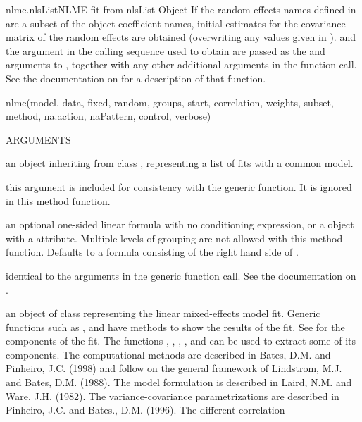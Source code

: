 \documentclass[pdftex]{article} \usepackage{url,graphicx}
\begin{document}
\begin{Helpfile}{nlme.nlsList}{NLME fit from nlsList Object}
If the random effects names defined in  are a subset of
the  object coefficient names, initial estimates for the
covariance matrix of the random effects are obtained (overwriting any
values given in ).  and the
 argument in the calling sequence used to obtain
 are passed as the  and  arguments
to , together with any other additional arguments in
the function call. See the documentation on  for a
description of that function.
\begin{Example}
nlme(model, data, fixed, random, groups, start, correlation, weights,
     subset, method, na.action, naPattern, control, verbose)
\end{Example}
\begin{Argument}{ARGUMENTS}
\item[\Co{model:}]
an object inheriting from class ,
representing a list of  fits with a common model.
\item[\Co{data:}]
this argument is included for consistency with the generic
function. It is ignored in this method function.
\item[\Co{random:}]
an optional one-sided linear formula with no conditioning
expression, or a  object with a 
attribute. Multiple levels of grouping are not allowed with this
method function.  Defaults to a formula consisting of the right hand
side of .
\item[\Co{other arguments:}]
identical to the arguments in the generic
function call. See the documentation on .
\end{Argument}
an object of class  representing the linear mixed-effects
model fit. Generic functions such as ,  and
 have methods to show the results of the fit. See
 for the components of the fit. The functions
, , , , and
  can be used to extract some of its components.
The computational methods are described in Bates, D.M. and Pinheiro, J.C.
(1998) and follow on the general framework of Lindstrom, M.J. and Bates,
D.M. (1988). The model formulation is described in Laird, N.M. and Ware,
J.H. (1982).  The variance-covariance parametrizations are described in
Pinheiro, J.C. and Bates., D.M.  (1996).   The different correlation

\end{Helpfile}
\end{document}
